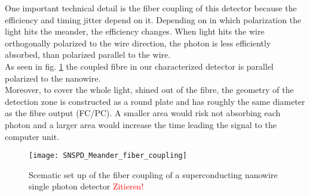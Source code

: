 One important technical detail is the fiber coupling of this detector because the efficiency
and timing jitter depend on it.
Depending on in which polarization the light hits the meander, the efficiency changes.
When light hits the wire orthogonally polarized to the wire direction, the photon is less efficiently absorbed, than
polarized parallel to the wire. \\ As seen in fig. \ref{fig:SNSPD_fiber_coupling} the coupled fibre in our characterized
detector is parallel polarized to the nanowire.\\
Moreover, to cover the whole light, shined out of the fibre, the geometry of the detection zone is constructed as a
round plate and has roughly the same diameter as the fibre output (FC/PC). A smaller area would risk not absorbing each
photon and a larger area would increase the time leading the signal to the computer unit.

\begin{figure}[hhh]
\texttt{[image: SNSPD\_Meander\_fiber\_coupling]}
\caption{Scematic set up of the fiber coupling of a superconducting nanowire single photon detector \textcolor{red}{Zitieren!}}
\label{fig:SNSPD_fiber_coupling}
\end{figure}
